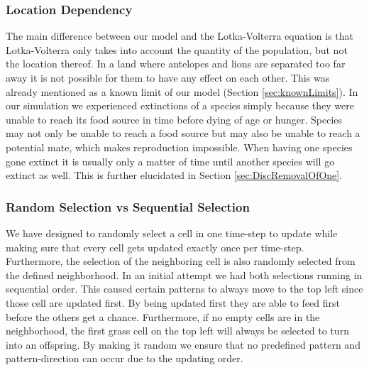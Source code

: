 \documentclass[11pt]{article}
\begin{document}
\subsubsection{Location Dependency}
\label{sec:DiscLocationDep}
The main difference between our model and the Lotka-Volterra equation is that Lotka-Volterra only takes into account the quantity of the population, but not the location thereof. In a land where antelopes and lions are separated too far away it is not possible for them to have any effect on each other. This was already mentioned as a known limit of our model (Section \ref{sec:knownLimits}). In our simulation we experienced extinctions of a species simply because they were unable to reach its food source in time before dying of age or hunger. Species may not only be unable to reach a food source but may also be unable to reach a potential mate, which makes reproduction impossible. When having one species gone extinct it is usually only a matter of time until another species will go extinct as well. This is further elucidated in Section \ref{sec:DiscRemovalOfOne}.

\subsubsection{Random Selection vs Sequential Selection}
We have designed to randomly select a cell in one time-step to update while making sure that every cell gets updated exactly once per time-step. Furthermore, the selection of the neighboring cell is also randomly selected from the defined neighborhood. In an initial attempt we had both selections running in sequential order. This caused certain patterns to always move to the top left since those cell are updated first. By being updated first they are able to feed first before the others get a chance. Furthermore, if no empty cells are in the neighborhood, the first grass cell on the top left will always be selected to turn into an offspring. By making it random we ensure that no predefined pattern and pattern-direction can occur due to the updating order.
\end{document}
